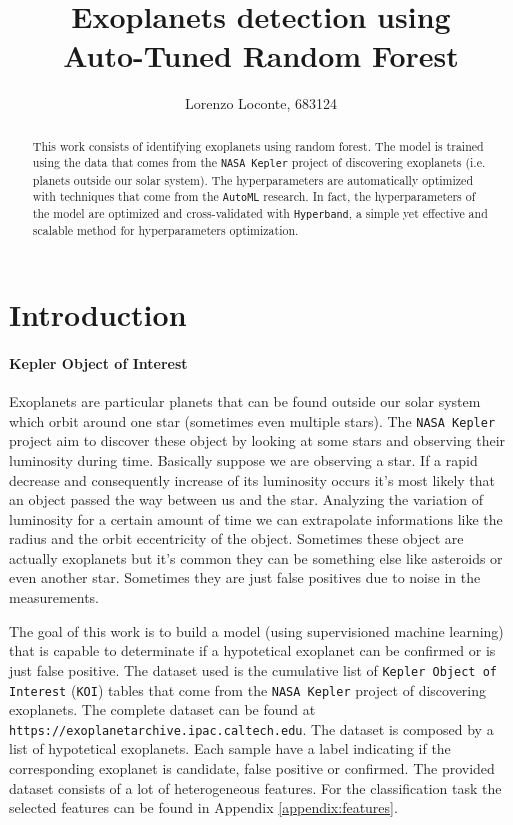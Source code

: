 \documentclass[11pt, a4paper]{article}
\date{}
\title{Exoplanets detection using \\ Auto-Tuned Random Forest}
\author{Lorenzo Loconte, 683124}
\begin{document}
\maketitle
\begin{abstract}
  This work consists of identifying exoplanets using random forest.
  The model is trained using the data that comes from the \texttt{NASA Kepler} project of discovering exoplanets (i.e. planets outside our solar system).
  The hyperparameters are automatically optimized with techniques that come from the \texttt{AutoML} research.
  In fact, the hyperparameters of the model are optimized and cross-validated with \texttt{Hyperband}, a simple yet effective and scalable method for hyperparameters optimization.
\end{abstract}

\section{Introduction}
  \paragraph{Kepler Object of Interest}
    Exoplanets are particular planets that can be found outside our solar system which orbit around one star (sometimes even multiple stars).
    The \texttt{NASA Kepler} project aim to discover these object by looking at some stars and observing their luminosity during time.
    Basically suppose we are observing a star.
    If a rapid decrease and consequently increase of its luminosity occurs it's most likely that an object passed the way between us and the star.
    Analyzing the variation of luminosity for a certain amount of time we can extrapolate informations like the radius and the orbit eccentricity of the object.
    Sometimes these object are actually exoplanets but it's common they can be something else like asteroids or even another star.
    Sometimes they are just false positives due to noise in the measurements.

    The goal of this work is to build a model (using supervisioned machine learning) that is capable to determinate if a hypotetical exoplanet can be confirmed or is just false positive.
    The dataset used is the cumulative list of \texttt{Kepler Object of Interest} (\texttt{KOI}) tables that come from the \texttt{NASA Kepler} project of discovering exoplanets.
    The complete dataset can be found at \texttt{https://exoplanetarchive.ipac.caltech.edu}.
    The dataset is composed by a list of hypotetical exoplanets.
    Each sample have a label indicating if the corresponding exoplanet is candidate, false positive or confirmed.
    The provided dataset consists of a lot of heterogeneous features.
    For the classification task the selected features can be found in Appendix \ref{appendix:features}.
    
\end{document}
